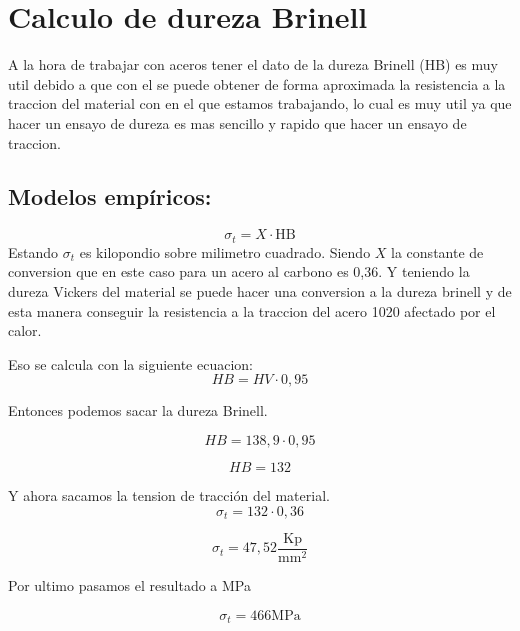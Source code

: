 \documentclass[12pt,a4paper]{article}
\begin{document}
\section{Calculo de dureza Brinell}

A la hora de trabajar con aceros tener el dato de la dureza Brinell (HB) es muy util debido a que con el se puede obtener de forma aproximada la resistencia a la traccion del material con en el que estamos trabajando, 
lo cual es muy util ya que hacer un ensayo de dureza es mas sencillo y rapido que hacer un ensayo de traccion.

\subsection{Modelos empíricos:}

\begin{equation}
    \sigma_t = X \cdot \text{HB}
\end{equation}
Estando $\sigma_t$  es kilopondio sobre milimetro cuadrado.
Siendo $X$ la constante de conversion que en este caso para un acero al carbono es 0,36. 
Y teniendo la dureza Vickers del material se puede hacer una conversion a la dureza brinell y de esta manera conseguir la resistencia a la traccion del acero 1020 afectado por el calor.

Eso se calcula con la siguiente ecuacion:
\begin{equation}
    HB = HV \cdot 0,95
\end{equation}

Entonces podemos sacar la dureza Brinell.

\begin{equation}
    HB = 138,9 \cdot 0,95
\end{equation}

\begin{equation}
    HB = 132
\end{equation}

Y ahora sacamos la tension de tracción del material.
\begin{equation}
    \sigma_t = 132 \cdot 0,36
\end{equation}

\begin{equation}
    \sigma_t = 47,52 \frac{\text{Kp}}{\text{mm}^2}
\end{equation}

Por ultimo pasamos el resultado a MPa

\begin{equation}
    \sigma_t = 466 \text{MPa}
\end{equation}
\end{document}
